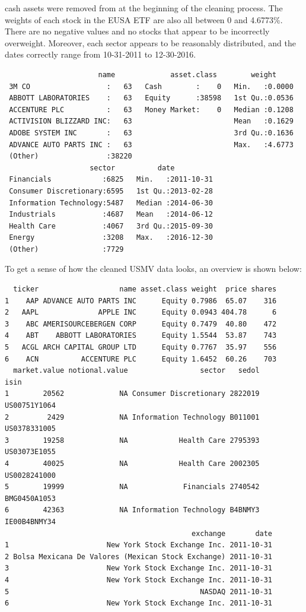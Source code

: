 \documentclass[12pt,twoside]{reedthesis}
\theoremstyle{definition}
\theoremstyle{definition}
\theoremstyle{definition}
\theoremstyle{remark}
\begin{document}
cash assets were removed from at the beginning of the cleaning process.
The weights of each stock in the EUSA ETF are also all between 0 and
4.6773\%. There are no negative values and no stocks that appear to be
incorrectly overweight. Moreover, each sector appears to be reasonably
distributed, and the dates correctly range from 10-31-2011 to
12-30-2016.
\begin{verbatim}
                      name             asset.class        weight      
 3M CO                  :   63   Cash        :    0   Min.   :0.0000  
 ABBOTT LABORATORIES    :   63   Equity      :38598   1st Qu.:0.0536  
 ACCENTURE PLC          :   63   Money Market:    0   Median :0.1208  
 ACTIVISION BLIZZARD INC:   63                        Mean   :0.1629  
 ADOBE SYSTEM INC       :   63                        3rd Qu.:0.1636  
 ADVANCE AUTO PARTS INC :   63                        Max.   :4.6773  
 (Other)                :38220                                        
                    sector          date           
 Financials            :6825   Min.   :2011-10-31  
 Consumer Discretionary:6595   1st Qu.:2013-02-28  
 Information Technology:5487   Median :2014-06-30  
 Industrials           :4687   Mean   :2014-06-12  
 Health Care           :4067   3rd Qu.:2015-09-30  
 Energy                :3208   Max.   :2016-12-30  
 (Other)               :7729                       
\end{verbatim}
To get a sense of how the cleaned USMV data looks, an overview is shown
below:
\begin{verbatim}
  ticker                   name asset.class weight  price shares
1    AAP ADVANCE AUTO PARTS INC      Equity 0.7986  65.07    316
2   AAPL              APPLE INC      Equity 0.0943 404.78      6
3    ABC AMERISOURCEBERGEN CORP      Equity 0.7479  40.80    472
4    ABT    ABBOTT LABORATORIES      Equity 1.5544  53.87    743
5   ACGL ARCH CAPITAL GROUP LTD      Equity 0.7767  35.97    556
6    ACN          ACCENTURE PLC      Equity 1.6452  60.26    703
  market.value notional.value                 sector   sedol         isin
1        20562             NA Consumer Discretionary 2822019 US00751Y1064
2         2429             NA Information Technology B011001 US0378331005
3        19258             NA            Health Care 2795393 US03073E1055
4        40025             NA            Health Care 2002305 US0028241000
5        19999             NA             Financials 2740542 BMG0450A1053
6        42363             NA Information Technology B4BNMY3 IE00B4BNMY34
                                            exchange       date
1                       New York Stock Exchange Inc. 2011-10-31
2 Bolsa Mexicana De Valores (Mexican Stock Exchange) 2011-10-31
3                       New York Stock Exchange Inc. 2011-10-31
4                       New York Stock Exchange Inc. 2011-10-31
5                                             NASDAQ 2011-10-31
6                       New York Stock Exchange Inc. 2011-10-31
\end{verbatim}
\end{document}
